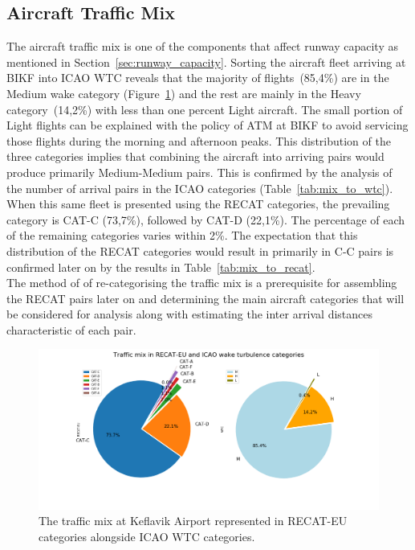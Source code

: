 \subsection{Aircraft Traffic Mix\label{ssec:traffic_mix}}
The aircraft traffic mix is one of the components that affect runway capacity as mentioned in Section~\ref{sec:runway_capacity}. Sorting the aircraft fleet arriving at BIKF into ICAO WTC reveals that the majority of flights~(85,4\%) are in the Medium wake category (Figure~\ref{fig:post_fast_exit_mix_pie_v2}) and the rest are mainly in the Heavy category~(14,2\%) with less than one percent Light aircraft. The small portion of Light flights can be explained with the policy of ATM at BIKF to avoid servicing those flights during the morning and afternoon peaks. This distribution of the three categories implies that combining the aircraft into arriving pairs would produce primarily Medium-Medium pairs. This is confirmed by the analysis of the number of arrival pairs in the ICAO categories (Table~\ref{tab:mix_to_wtc}).\\
When this same fleet is presented using the RECAT categories, the prevailing category is CAT-C (73,7\%), followed by CAT-D (22,1\%). The percentage of each of the remaining categories varies within 2\%. The expectation that this distribution of the RECAT categories would result in primarily in C-C pairs is confirmed later on by the results in Table~\ref{tab:mix_to_recat}. \\
The method of of re-categorising the traffic mix is a prerequisite for assembling the RECAT pairs later on and determining the main aircraft categories that will be considered for analysis along with estimating the inter arrival distances characteristic of each pair.

\begin{figure}[h]
    \centering
    \includegraphics[width=1\textwidth]{graphics/fig_post_fast_exit_mix_pie_v2.png}
    \caption[Traffic mix in RECAT-EU and ICAO WTC]{The traffic mix at Keflavik Airport represented in RECAT-EU categories alongside ICAO WTC categories.}
    \label{fig:post_fast_exit_mix_pie_v2}
\end{figure}

